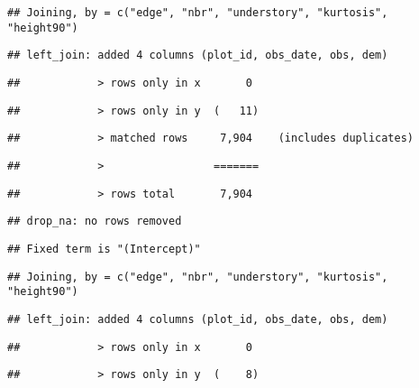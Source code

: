 \documentclass[
]{article}
\begin{document}
\begin{verbatim}
## Joining, by = c("edge", "nbr", "understory", "kurtosis", "height90")
\end{verbatim}

\begin{verbatim}
## left_join: added 4 columns (plot_id, obs_date, obs, dem)
\end{verbatim}

\begin{verbatim}
##            > rows only in x       0
\end{verbatim}

\begin{verbatim}
##            > rows only in y  (   11)
\end{verbatim}

\begin{verbatim}
##            > matched rows     7,904    (includes duplicates)
\end{verbatim}

\begin{verbatim}
##            >                 =======
\end{verbatim}

\begin{verbatim}
##            > rows total       7,904
\end{verbatim}

\begin{verbatim}
## drop_na: no rows removed
\end{verbatim}

\begin{verbatim}
## Fixed term is "(Intercept)"
\end{verbatim}

\begin{verbatim}
## Joining, by = c("edge", "nbr", "understory", "kurtosis", "height90")
\end{verbatim}

\begin{verbatim}
## left_join: added 4 columns (plot_id, obs_date, obs, dem)
\end{verbatim}

\begin{verbatim}
##            > rows only in x       0
\end{verbatim}

\begin{verbatim}
##            > rows only in y  (    8)
\end{verbatim}
\end{document}

